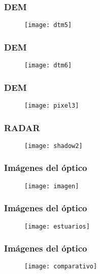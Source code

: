 \documentclass{beamer}
\begin{document}
\begin{frame}
\frametitle{DEM} 
 \begin{figure}
    \centering
    \texttt{[image: dtm5]}
  \end{figure}
\end{frame}
\begin{frame}
\frametitle{DEM} 
 \begin{figure}
    \centering
    \texttt{[image: dtm6]}
  \end{figure}
\end{frame}
\begin{frame}
\frametitle{DEM} 
 \begin{figure}
    \centering
    \texttt{[image: pixel3]}
  \end{figure}
\end{frame}
\begin{frame}
\frametitle{RADAR} 
 \begin{figure}
    \centering
    \texttt{[image: shadow2]}
  \end{figure}
\end{frame}
\begin{frame}
\frametitle{Imágenes del óptico} 
 \begin{figure}
    \centering
    \texttt{[image: imagen]}
  \end{figure}
\end{frame}
\begin{frame}
\frametitle{Imágenes del óptico} 
 \begin{figure}
    \centering
    \texttt{[image: estuarios]}
  \end{figure}
\end{frame}
\begin{frame}
\frametitle{Imágenes del óptico} 
 \begin{figure}
    \centering
    \texttt{[image: comparativo]}
  \end{figure}
\end{frame}
\end{document}
